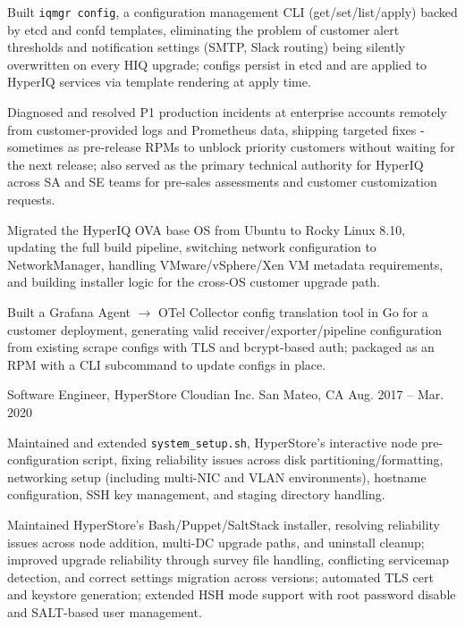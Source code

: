 \begin{cventries}
{\begin{cvitems}
        \item {Built \texttt{iqmgr config}, a configuration management CLI (get/set/list/apply) backed by etcd and confd templates, eliminating the problem of customer alert thresholds and notification settings (SMTP, Slack routing) being silently overwritten on every HIQ upgrade; configs persist in etcd and are applied to HyperIQ services via template rendering at apply time.}
        \item {Diagnosed and resolved P1 production incidents at enterprise accounts remotely from customer-provided logs and Prometheus data, shipping targeted fixes - sometimes as pre-release RPMs to unblock priority customers without waiting for the next release; also served as the primary technical authority for HyperIQ across SA and SE teams for pre-sales assessments and customer customization requests.}
        \item {Migrated the HyperIQ OVA base OS from Ubuntu to Rocky Linux 8.10, updating the full build pipeline, switching network configuration to NetworkManager, handling VMware/vSphere/Xen VM metadata requirements, and building installer logic for the cross-OS customer upgrade path.}
        \item {Built a Grafana Agent $\to$ OTel Collector config translation tool in Go for a customer deployment, generating valid receiver/exporter/pipeline configuration from existing scrape configs with TLS and bcrypt-based auth; packaged as an RPM with a CLI subcommand to update configs in place.}
      \end{cvitems}
    }

  \cventry
    {Software Engineer, HyperStore}
    {Cloudian Inc.}
    {San Mateo, CA}
    {Aug. 2017 -- Mar. 2020}
    {
      \begin{cvitems}
        \item {Maintained and extended \texttt{system\_setup.sh}, HyperStore's interactive node pre-configuration script, fixing reliability issues across disk partitioning/formatting, networking setup (including multi-NIC and VLAN environments), hostname configuration, SSH key management, and staging directory handling.}
        \item {Maintained HyperStore's Bash/Puppet/SaltStack installer, resolving reliability issues across node addition, multi-DC upgrade paths, and uninstall cleanup; improved upgrade reliability through survey file handling, conflicting servicemap detection, and correct settings migration across versions; automated TLS cert and keystore generation; extended HSH mode support with root password disable and SALT-based user management.}
      \end{cvitems}
    }

\end{cventries}
